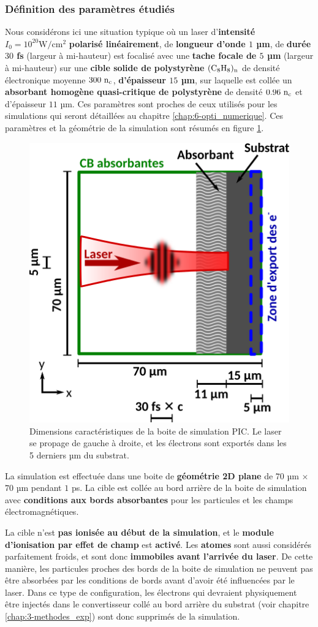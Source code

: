 \begin{refsection}
\subsubsection{Définition des paramètres étudiés}

Nous considérons ici une situation typique où un laser d'\textbf{intensité $I_0=10^{20} \si{\W\per\cm^2}$} \textbf{polarisé linéairement}, de \textbf{longueur d'onde $1$ µm}, de \textbf{durée $30$ fs} (largeur à mi-hauteur) est focalisé avec une \textbf{tache focale de $5$ µm} (largeur à mi-hauteur) sur une \textbf{cible solide de polystyrène} $\rm (C_8 H_8)_n$ de densité électronique moyenne $300 ~ \rm n_c$, \textbf{d'épaisseur $15$ µm}, sur laquelle est collée un \textbf{absorbant homogène quasi-critique de polystyrène} de densité $0.96 ~ \rm n_c$ et d'épaisseur $11$ µm. Ces paramètres sont proches de ceux utilisés pour les simulations qui seront détaillées au chapitre \ref{chap:6-opti_numerique}. Ces paramètres et la géométrie de la simulation sont résumés en figure \ref{fig:4-PIC_boite_simu_validation}.

\begin{figure}[hbtp]
	\centering
	\includegraphics[width=0.5\linewidth]{4-simulation/boite_simu_validation.png}
	\caption{Dimensions caractéristiques de la boite de simulation PIC. Le laser se propage de gauche à droite, et les électrons sont exportés dans les 5 derniers µm du substrat.}
	\label{fig:4-PIC_boite_simu_validation}
\end{figure}

La simulation est effectuée dans une boite de \textbf{géométrie 2D plane} de $70$ µm $\times$ $70$ µm pendant $1$ ps. La cible est collée au bord arrière de la boite de simulation avec \textbf{conditions aux bords absorbantes} pour les particules et les champs électromagnétiques. 

La cible n'est \textbf{pas ionisée au début de la simulation}, et le \textbf{module d'ionisation par effet de champ} est \textbf{activé}. Les \textbf{atomes} sont aussi considérés parfaitement froids, et sont donc \textbf{immobiles avant l'arrivée du laser}. De cette manière, les particules proches des bords de la boite de simulation ne peuvent pas être absorbées par les conditions de bords avant d'avoir été influencées par le laser. Dans ce type de configuration, les électrons qui devraient physiquement être injectés dans le convertisseur collé au bord arrière du substrat (voir chapitre \ref{chap:3-methodes_exp}) sont donc supprimés de la simulation.


\end{refsection}
